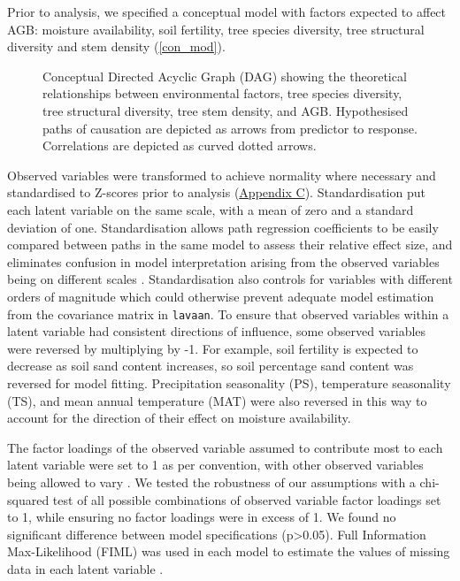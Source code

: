 \documentclass[11pt,a4paper]{article}
\begin{document}
Prior to analysis, we specified a conceptual model with factors expected to affect AGB: moisture availability, soil fertility, tree species diversity, tree structural diversity and stem density (\autoref{con_mod}). 

\begin{figure}[H]
\centering
	
	\caption{Conceptual Directed Acyclic Graph (DAG) showing the theoretical relationships between environmental factors, tree species diversity, tree structural diversity, tree stem density, and AGB. Hypothesised paths of causation are depicted as arrows from predictor to response. Correlations are depicted as curved dotted arrows.}
	\label{con_mod}
\end{figure}

Observed variables were transformed to achieve normality where necessary and standardised to Z-scores prior to analysis (\hyperref[appendixc]{Appendix C}). Standardisation put each latent variable on the same scale, with a mean of zero and a standard deviation of one. Standardisation allows path regression coefficients to be easily compared between paths in the same model to assess their relative effect size, and eliminates confusion in model interpretation arising from the observed variables being on different scales \citep{Beaujean2014}. Standardisation also controls for variables with different orders of magnitude which could otherwise prevent adequate model estimation from the covariance matrix in \verb|lavaan|. To ensure that observed variables within a latent variable had consistent directions of influence, some observed variables were reversed by multiplying by -1. For example, soil fertility is expected to decrease as soil sand content increases, so soil percentage sand content was reversed for model fitting. Precipitation seasonality (PS), temperature seasonality (TS), and mean annual temperature (MAT) were also reversed in this way to account for the direction of their effect on moisture availability.


The factor loadings of the observed variable assumed to contribute most to each latent variable were set to 1 as per convention, with other observed variables being allowed to vary \citep{Beaujean2014}.  We tested the robustness of our assumptions with a chi-squared test of all possible combinations of observed variable factor loadings set to 1, while ensuring no factor loadings were in excess of 1. We found no significant difference between model specifications (p>0.05). Full Information Max-Likelihood (FIML) was used in each model to estimate the values of missing data in each latent variable \citep{Cham2017}.
\end{document}
